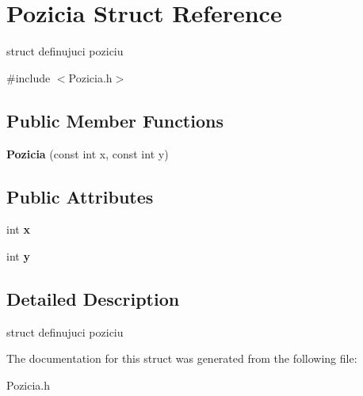 \hypertarget{struct_pozicia}{\section{Pozicia Struct Reference}
\label{struct_pozicia}
}


struct definujuci poziciu  




{\ttfamily \#include $<$Pozicia.\-h$>$}

\subsection*{Public Member Functions}
\begin{DoxyCompactItemize}
\item 
\hypertarget{struct_pozicia_a9504f32b736dd8851a4d2dc6f879f747}{{\bfseries Pozicia} (const int x, const int y)}\label{struct_pozicia_a9504f32b736dd8851a4d2dc6f879f747}

\end{DoxyCompactItemize}
\subsection*{Public Attributes}
\begin{DoxyCompactItemize}
\item 
\hypertarget{struct_pozicia_a6e6399f4cb1223dc64b79c3193576de2}{int {\bfseries x}}\label{struct_pozicia_a6e6399f4cb1223dc64b79c3193576de2}

\item 
\hypertarget{struct_pozicia_a9a149a110efda12e363480be0492545d}{int {\bfseries y}}\label{struct_pozicia_a9a149a110efda12e363480be0492545d}

\end{DoxyCompactItemize}


\subsection{Detailed Description}
struct definujuci poziciu 

The documentation for this struct was generated from the following file\-:\begin{DoxyCompactItemize}
\item 
Pozicia.\-h\end{DoxyCompactItemize}

